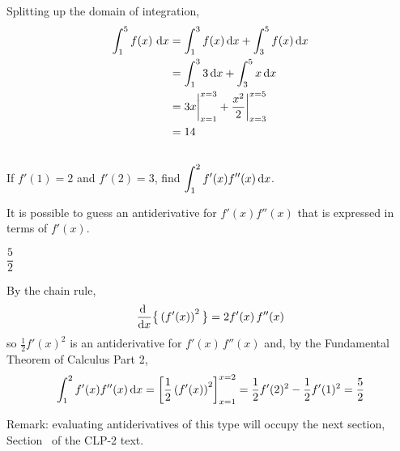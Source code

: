 \begin{solution}
Splitting up the domain of integration,
\begin{align*}
 \int_1^5 f(x)\ \mathrm{d}x
&= \int_1^3 f(x)\,\mathrm{d}x   +  \int_3^5 f(x)\,\mathrm{d}x \\
&= \int_1^3  3\,\mathrm{d}x   +  \int_3^5 x\,\mathrm{d}x \\
&= 3x\bigg|_{x=1}^{x=3} +\frac{x^2}{2} \bigg|_{x=3}^{x=5} \\
&=14
\end{align*}

\begin{center}
\end{center}

\end{solution}




\subsection*{\Application}


\begin{question}[M105 2014A]
If $f'(1)=2$ and $f'(2)=3$, find $\displaystyle\int_1^2 f'(x) f''(x)\,\mathrm{d}x$.
\end{question}

\begin{hint}
It is possible to guess an antiderivative for $f'(x) f''(x)$
that is expressed in terms of $f'(x)$.
\end{hint}

\begin{answer}
$\dfrac{5}{2}$
\end{answer}

\begin{solution}
By the chain rule,
\begin{align*}
\diff{}{x}\big\{\left(f'(x)\right)^2\big\} = 2 f'(x)\,f''(x)
\end{align*}
so $\frac{1}{2} f'(x)^2$ is an antiderivative for $f'(x)\,f''(x)$ and,
by the Fundamental Theorem of Calculus Part 2,
\begin{align*}
\int_1^2 f'(x) f''(x)\,\mathrm{d}x
=\left[\frac{1}{2}\left(f'(x)\right)^2\right]_{x=1}^{x=2}
=\frac{1}{2} f'(2)^2 - \frac{1}{2} f'(1)^2
=\frac{5}{2}
\end{align*}

Remark: evaluating antiderivatives of this type will occupy the next section, Section~ of the CLP-2 text.
\end{solution}



